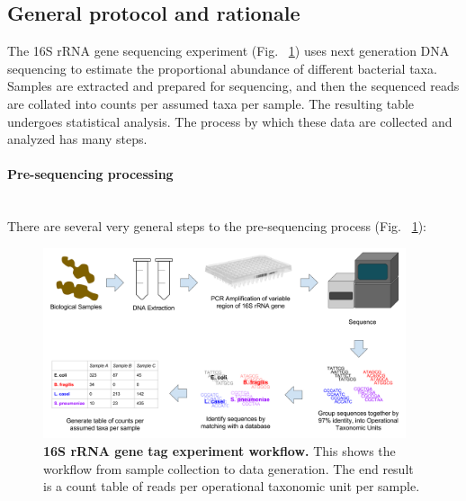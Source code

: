 \subsection{General protocol and rationale}
The 16S rRNA gene sequencing experiment (Fig. ~\ref{16s_workflow}) uses next generation DNA sequencing to estimate the proportional abundance of different bacterial taxa. Samples are extracted and prepared for sequencing, and then the sequenced reads are collated into counts per assumed taxa per sample. The resulting table undergoes statistical analysis. The process by which these data are collected and analyzed has many steps.

\paragraph{Pre-sequencing processing}\mbox{}\\
There are several very general steps to the pre-sequencing process (Fig. ~\ref{16s_workflow}):

\begin{figure}[h]
\begin{center}
\includegraphics[width=0.95\textwidth]{16S_rRNA_pipeline.png}
\caption[16S rRNA gene tag experiment workflow.]{\textbf{16S rRNA gene tag experiment workflow.} This shows the workflow from sample collection to data generation. The end result is a count table of reads per operational taxonomic unit per sample.}
\label{16s_workflow}
\end{center}
\end{figure}

